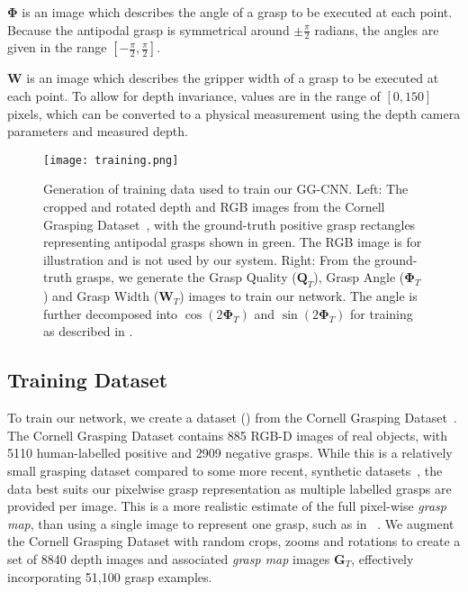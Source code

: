 \documentclass[conference]{IEEEtran}
\newcommand{\cG}{\mathbf{G}}
\newcommand{\cQ}{\mathbf{Q}}
\newcommand{\cW}{\mathbf{W}}
\newcommand{\bPhi}{\mathbf{\Phi}}
\begin{document}
$\bPhi$ is an image which describes the angle of a grasp to be executed at each point.  Because the antipodal grasp is symmetrical around $\pm\frac{\pi}{2}$ radians, the angles are given in the range $[-\frac{\pi}{2},\frac{\pi}{2}]$.

\vspace{1mm} $\cW$ is an image which describes the gripper width of a grasp to be executed at each point.  To allow for depth invariance, values are in the range of $[0, 150]$ pixels, which can be converted to a physical measurement using the depth camera parameters and measured depth.

\begin{figure}[tpb]
    \centering
    \texttt{[image: training.png]}
    \vspace{-6mm}
    \caption{Generation of training data used to train our GG-CNN.  Left: The cropped and rotated depth and RGB images from the Cornell Grasping Dataset~\cite{Lenz2015DeepGrasps}, with the ground-truth positive grasp rectangles representing antipodal grasps shown in green.  The RGB image is for illustration and is not used by our system.  Right: From the ground-truth grasps, we generate the Grasp Quality ($\cQ_T$), Grasp  Angle ($\bPhi_T$) and Grasp Width ($\cW_T$) images to train our network.  The angle is further decomposed into $\cos(2\bPhi_T)$ and $\sin(2\bPhi_T)$ for training as described in .
    }
  \label{fig:training} 
  \vspace{-6mm}
\end{figure}

\subsection{Training Dataset}
\label{sec:trainingdata}

To train our network, we create a dataset () from the Cornell Grasping Dataset~\cite{Lenz2015DeepGrasps}.  The Cornell Grasping Dataset contains 885 RGB-D images of real objects, with 5110 human-labelled positive and 2909 negative grasps.  While this is a relatively small grasping dataset compared to some more recent, synthetic datasets~\cite{Mahler2016Dex1, Mahler2017Dex2}, the data best suits our pixelwise grasp representation as multiple labelled grasps are provided per image. 
This is a more realistic estimate of the full pixel-wise \textit{grasp map}, than using a single image to represent one grasp, such as in ~\cite{Mahler2017Dex2}.
We augment the Cornell Grasping Dataset with random crops, zooms and rotations to create a set of 8840 depth images and associated \textit{grasp map} images $\cG_T$, effectively incorporating 51,100 grasp examples.  
\end{document}
